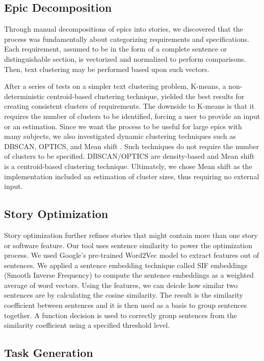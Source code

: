 \subsection{Epic Decomposition}
Through manual decompositions of epics into stories, we discovered that the process was fundamentally about categorizing requirements and specifications. Each requirement, assumed to be in the form of a complete sentence or distinguishable section, is vectorized and normalized to perform comparisons. Then, text clustering may be performed based upon such vectors. 

After a series of tests on a simpler text clustering problem, K-means, a non-deterministic centroid-based clustering technique, yielded the best results for creating consistent clusters of requirements. The downside to K-means is that it requires the number of clusters to be identified, forcing a user to provide an input or an estimation. Since we want the process to be useful for large epics with many subjects, we also investigated dynamic clustering techniques such as DBSCAN, OPTICS, and Mean shift \cite{}. Such techniques do not require the number of clusters to be specified. DBSCAN/OPTICS are density-based and Mean shift is a centroid-based clustering technique. Ultimately, we chose Mean shift as the implementation included an estimation of cluster sizes, thus requiring no external input.

\subsection{Story Optimization}

Story optimization further refines stories that might contain more than one story or software feature. Our tool uses sentence similarity to power the optimization process. We used Google's pre-trained Word2Vec model\cite{googleword2vec} to extract features out of sentences. We applied a sentence embedding technique called SIF embeddings (Smooth Inverse Frequency) to compute the sentence embeddings as a weighted average of word vectors. Using the features, we can deicde how similar two sentences are by calculating the cosine similarity. 
The result is the similarity coefficient between sentences and it is then used as a basis to group sentences together. A function decision is used to correctly group sentences from the similarity coefficient using a specified threshold level. 

\subsection{Task Generation}

